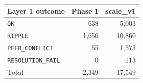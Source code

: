 \begin{tabular}{lrr}
\toprule
Layer 1 outcome & Phase 1 & scale\_v1 \\
\midrule
\texttt{OK} & 638 & 5,003 \\
\texttt{RIPPLE} & 1,656 & 10,860 \\
\texttt{PEER\_CONFLICT} & 55 & 1,573 \\
\texttt{RESOLUTION\_FAIL} & 0 & 113 \\
Total & 2,349 & 17,549 \\
\bottomrule
\end{tabular}
